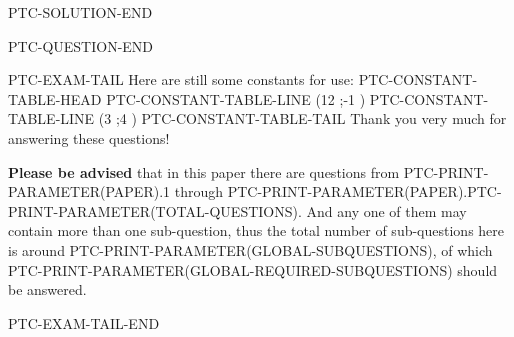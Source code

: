 \documentclass[12pt]{article}
\begin{document}
PTC-SOLUTION-END

\vspace{0.3in}
PTC-QUESTION-END



PTC-EXAM-TAIL
Here are still some constants for use:
PTC-CONSTANT-TABLE-HEAD
PTC-CONSTANT-TABLE-LINE (12 ;-1                   )
PTC-CONSTANT-TABLE-LINE (3 ;4               )
PTC-CONSTANT-TABLE-TAIL
Thank you very much for answering these questions!

{\textbf{\large{Please be advised}}} that in this paper there are questions from
PTC-PRINT-PARAMETER(PAPER).1 through
PTC-PRINT-PARAMETER(PAPER).PTC-PRINT-PARAMETER(TOTAL-QUESTIONS).
And any one of them may contain more than one sub-question, thus the total number
of sub-questions here is around PTC-PRINT-PARAMETER(GLOBAL-SUBQUESTIONS), of which
PTC-PRINT-PARAMETER(GLOBAL-REQUIRED-SUBQUESTIONS) should be answered.

PTC-EXAM-TAIL-END
\end{document}
